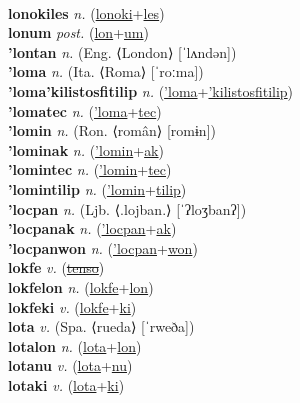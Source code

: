  \label{lonoki} \\
\textbf{lonokiles} \textit{n.} (\hyperref[lonoki]{lonoki}+\hyperref[les]{les})
 \label{lonokiles} \\
\textbf{lonum} \textit{post.} (\hyperref[lon]{lon}+\hyperref[um]{um})
 \label{lonum} \\
\textbf{'lontan} \textit{n.} (Eng. ⟨London⟩ [ˈlʌndən])
 \label{'lontan} \\
\textbf{'loma} \textit{n.} (Ita. ⟨Roma⟩ [ˈroːma])
 \label{'loma} \\
\textbf{'loma'kilistosfitilip} \textit{n.} (\hyperref['loma]{'loma}+\hyperref['kilistosfitilip]{'kilistosfitilip})
 \label{'loma'kilistosfitilip} \\
\textbf{'lomatec} \textit{n.} (\hyperref['loma]{'loma}+\hyperref[tec]{tec})
 \label{'lomatec} \\
\textbf{'lomin} \textit{n.} (Ron. ⟨român⟩ [romɨn])
 \label{'lomin} \\
\textbf{'lominak} \textit{n.} (\hyperref['lomin]{'lomin}+\hyperref[ak]{ak})
 \label{'lominak} \\
\textbf{'lomintec} \textit{n.} (\hyperref['lomin]{'lomin}+\hyperref[tec]{tec})
 \label{'lomintec} \\
\textbf{'lomintilip} \textit{n.} (\hyperref['lomin]{'lomin}+\hyperref[tilip]{tilip})
 \label{'lomintilip} \\
\textbf{'locpan} \textit{n.} (Ljb. ⟨.lojban.⟩ [ˈʔloʒbanʔ])
 \label{'locpan} \\
\textbf{'locpanak} \textit{n.} (\hyperref['locpan]{'locpan}+\hyperref[ak]{ak})
 \label{'locpanak} \\
\textbf{'locpanwon} \textit{n.} (\hyperref['locpan]{'locpan}+\hyperref[won]{won})
 \label{'locpanwon} \\
\textbf{lokfe} \textit{v.} (\hyperref[tenso]{\sout{tenso}})
 \label{lokfe} \\
\textbf{lokfelon} \textit{n.} (\hyperref[lokfe]{lokfe}+\hyperref[lon]{lon})
 \label{lokfelon} \\
\textbf{lokfeki} \textit{v.} (\hyperref[lokfe]{lokfe}+\hyperref[ki]{ki})
 \label{lokfeki} \\
\textbf{lota} \textit{v.} (Spa. ⟨rueda⟩ [ˈrweða])
 \label{lota} \\
\textbf{lotalon} \textit{n.} (\hyperref[lota]{lota}+\hyperref[lon]{lon})
 \label{lotalon} \\
\textbf{lotanu} \textit{v.} (\hyperref[lota]{lota}+\hyperref[nu]{nu})
 \label{lotanu} \\
\textbf{lotaki} \textit{v.} (\hyperref[lota]{lota}+\hyperref[ki]{ki})
